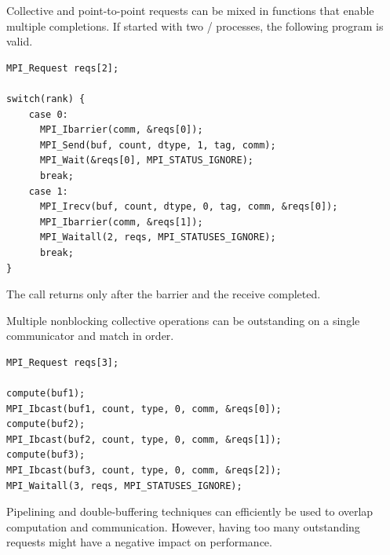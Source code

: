 \begin{example}
\label{coll-nbexN5}
%
%
Collective and point-to-point requests can be mixed in functions that
enable multiple completions. If started with two \MPI/ processes, the
following program is valid.

\begin{lstlisting}[language={[MPI]C}]
MPI_Request reqs[2];

switch(rank) {
    case 0:
      MPI_Ibarrier(comm, &reqs[0]);
      MPI_Send(buf, count, dtype, 1, tag, comm);
      MPI_Wait(&reqs[0], MPI_STATUS_IGNORE);
      break;
    case 1:
      MPI_Irecv(buf, count, dtype, 0, tag, comm, &reqs[0]);
      MPI_Ibarrier(comm, &reqs[1]);
      MPI_Waitall(2, reqs, MPI_STATUSES_IGNORE);
      break;
}
\end{lstlisting}

The  call returns only after the barrier and the receive completed.

\end{example}

\begin{example}
\label{coll-nbexN6}
%
%
Multiple nonblocking collective operations can be outstanding on a
single communicator and match in order.

\begin{lstlisting}[language={[MPI]C}]
MPI_Request reqs[3];

compute(buf1);
MPI_Ibcast(buf1, count, type, 0, comm, &reqs[0]);
compute(buf2);
MPI_Ibcast(buf2, count, type, 0, comm, &reqs[1]);
compute(buf3);
MPI_Ibcast(buf3, count, type, 0, comm, &reqs[2]);
MPI_Waitall(3, reqs, MPI_STATUSES_IGNORE);
\end{lstlisting}

\end{example}

\begin{users}
Pipelining and double-buffering techniques can efficiently be used to
overlap computation and communication. However, having too many
outstanding requests might have a negative impact on performance.
\end{users}

